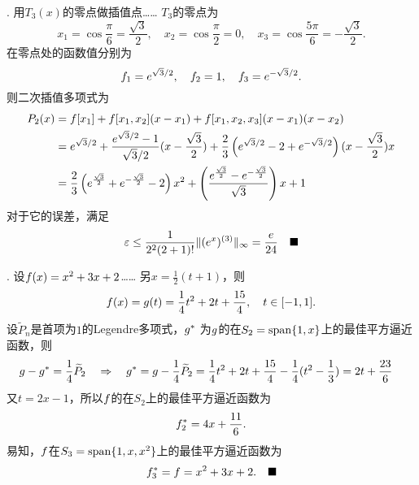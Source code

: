 \vspace{1cm}
\par{}. 用$T_3(x)$的零点做插值点……
\ans
  $T_3$的零点为
  \[
    x_1 = \cos\frac{\pi}{6} = \frac{\sqrt{3}}{2},\quad
    x_2 = \cos\frac{\pi}{2} = 0,\quad
    x_3 = \cos\frac{5\pi}{6} = -\frac{\sqrt{3}}{2}.
  \]
  在零点处的函数值分别为
  \[
    \mathnormal{f}_1 = e^{\sqrt{3}/2},\quad \mathnormal{f}_2 = 1,\quad \mathnormal{f}_3 = e^{-\sqrt{3}/2}.
  \]
  则二次插值多项式为
  \[\begin{split}
    P_2(x) &= \mathnormal{f}[x_1] + \mathnormal{f}[x_1,x_2](x-x_1) +
    \mathnormal{f}[x_1, x_2, x_3](x-x_1)(x-x_2) \\
    &= e^{\sqrt{3}/2} + \frac{e^{\sqrt{3}/2}-1}{\sqrt{3}/2}(x-\frac{\sqrt{3}}{2})
    + \frac{2}{3}\left(e^{\sqrt{3}/2} - 2 + e^{-\sqrt{3}/2}\right)(x-\frac{\sqrt{3}}{2})x\\
    &= \frac{2}{3}\left( e^{\frac{\sqrt{3}}{2}} + e^{-\frac{\sqrt{3}}{2}} - 2\right)x^2
    + \left( \frac{e^{\frac{\sqrt{3}}{2}} - e^{-\frac{\sqrt{3}}{2}}}{\sqrt{3}} \right)x + 1
  \end{split}\]
  对于它的误差，满足
  \[
    \varepsilon \le \frac{1}{2^2(2+1)!}\|(e^x)^{(3)}\|_{\infty}
    = \frac{e}{24} \quad\blacksquare
  \]

\vspace{1cm}
\par{}. 设$\mathnormal{f}(x) = x^2 + 3x + 2$……
\ans
  另$x=\frac{1}{2}(t+1)$，则
  \[
    \mathnormal{f}(x) = \mathnormal{g}(t) = \frac{1}{4}t^2+2t+\frac{15}{4},\quad t\in[-1, 1].
  \]
  设$\widetilde{P}_n$是首项为$1$的Legendre多项式，$\mathnormal{g}^*$
  为$\mathnormal{g}$的在$S_2 = \operatorname{span}\{1,x\}$上的最佳平方逼近函数，则
  \[\begin{split}
    & \mathnormal{g}-\mathnormal{g}^* = \frac{1}{4} \widetilde{P}_2\quad
    \Rightarrow\quad \mathnormal{g}^* = \mathnormal{g}-\frac{1}{4}\widetilde{P}_2
    =\frac{1}{4}t^2+2t+\frac{15}{4} - \frac{1}{4}(t^2-\frac{1}{3})
    = 2t + \frac{23}{6}
  \end{split}\]
  又$t = 2x-1$，所以$\mathnormal{f}$的在$S_2$上的最佳平方逼近函数为
  \[
    \mathnormal{f}_2^* = 4x + \frac{11}{6}.
  \]
  易知，$\mathnormal{f}$在$S_3 = \operatorname{span}\{1,x,x^2\}$上的最佳平方逼近函数为
  \[
    \mathnormal{f}_3^* = \mathnormal{f} = x^2 + 3x + 2.\quad\blacksquare
  \]


